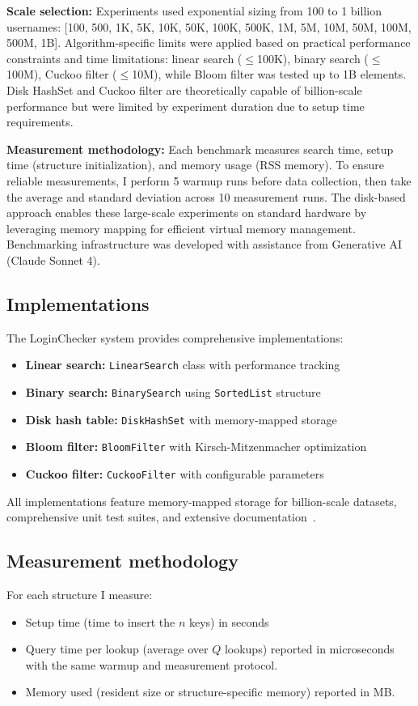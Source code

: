 \documentclass[sigconf]{acmart}
\begin{document}
\textbf{Scale selection:} Experiments used exponential sizing from 100 to 1 billion usernames: [100, 500, 1K, 5K, 10K, 50K, 100K, 500K, 1M, 5M, 10M, 50M, 100M, 500M, 1B]. Algorithm-specific limits were applied based on practical performance constraints and time limitations: linear search ($\leq$100K), binary search ($\leq$100M), Cuckoo filter ($\leq$10M), while Bloom filter was tested up to 1B elements. Disk HashSet and Cuckoo filter are theoretically capable of billion-scale performance but were limited by experiment duration due to setup time requirements.

\textbf{Measurement methodology:} Each benchmark measures search time, setup time (structure initialization), and memory usage (RSS memory). To ensure reliable measurements, I perform 5 warmup runs before data collection, then take the average and standard deviation across 10 measurement runs. The disk-based approach enables these large-scale experiments on standard hardware by leveraging memory mapping for efficient virtual memory management. Benchmarking infrastructure was developed with assistance from Generative AI (Claude Sonnet 4).


\subsection{Implementations}
The LoginChecker system provides comprehensive implementations:
\begin{itemize}
\item \textbf{Linear search:} \texttt{LinearSearch} class with performance tracking
\item \textbf{Binary search:} \texttt{BinarySearch} using \texttt{SortedList} structure
\item \textbf{Disk hash table:} \texttt{DiskHashSet} with memory-mapped storage
\item \textbf{Bloom filter:} \texttt{BloomFilter} with Kirsch-Mitzenmacher optimization
\item \textbf{Cuckoo filter:} \texttt{CuckooFilter} with configurable parameters
\end{itemize}
All implementations feature memory-mapped storage for billion-scale datasets, comprehensive unit test suites, and extensive documentation~\cite{loginchecker}.

\subsection{Measurement methodology}
For each structure I measure:
\begin{itemize}
\item Setup time (time to insert the $n$ keys) in seconds
\item Query time per lookup (average over $Q$ lookups) reported in microseconds with the same warmup and measurement protocol.
\item Memory used (resident size or structure-specific memory) reported in MB.
\end{itemize}
\end{document}
